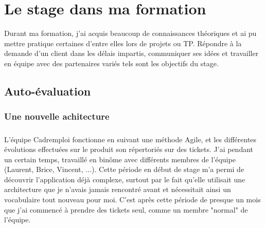 
\chapter{Le stage dans ma formation} %

\label{formation} %


Durant ma formation, j’ai acquis beaucoup de connaissances théoriques et ai pu mettre pratique certaines d’entre elles lors de projets ou TP.
Répondre à la demande d’un client dans les délais impartis, communiquer ses idées et travailler en équipe avec des partenaires variés tels sont les objectifs du stage.


\section{Auto-évaluation}
\subsection{Une nouvelle achitecture}
\label{sub:Une nouvelle achitecture}
\paragraph{}
L'équipe Cadremploi fonctionne en suivant une méthode Agile, et les différentes évolutions effectuées sur le produit son répertoriés sur des tickets.
J'ai pendant un certain temps, travaillé en binôme avec différents membres de l'équipe (Laurent, Brice, Vincent, ...).
Cette période en début de stage m'a permi de découvrir l'application déjà complexe, surtout par le fait qu'elle utilisait une architecture que je n'avais jamais rencontré avant et nécessitait ainsi un vocabulaire tout nouveau pour moi.
C'est après cette période de presque un mois que j'ai commencé à prendre des tickets seul, comme un membre "normal" de l'équipe.
